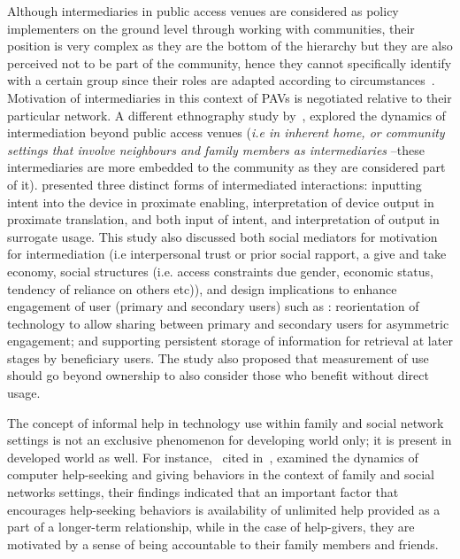 Although intermediaries in public access venues are considered as policy implementers on the ground level through working with communities, their position is very complex as they are the bottom of the hierarchy but they are also perceived not to be part of the community, hence they cannot specifically identify with a certain group since their roles are adapted according to circumstances~\citep{bailur2010liminal}. Motivation of intermediaries in this context of PAVs is negotiated relative to their particular network. A different ethnography study by~\cite{sambasivan2010}, explored the dynamics of intermediation beyond public access venues (\emph{i.e in inherent home, or community settings that involve neighbours and family members as intermediaries} --these intermediaries are more embedded to the community as they are considered part of it). \cite{sambasivan2010} presented three distinct forms of intermediated interactions: inputting intent into the device in proximate enabling, interpretation of device output in proximate translation, and both input of intent, and interpretation of output in surrogate usage. This study also discussed both social mediators for motivation for intermediation (i.e interpersonal trust or prior social rapport, a give and take economy, social structures (i.e. access constraints due gender, economic status, tendency of reliance on others etc)), and design implications to enhance engagement of user (primary and secondary users) such as : reorientation of technology  to allow sharing between primary and secondary users for asymmetric engagement; and supporting persistent storage of information for retrieval at later stages by beneficiary users. The study also proposed that measurement of use should go beyond ownership to also consider those who benefit without direct usage. 

The concept of informal help in technology use within family and social network settings is not an exclusive  phenomenon for developing world only; it is present in developed world as well. For instance,~\cite{poole:chh} cited in~\cite{katule2016leveraging}, examined the dynamics of computer help-seeking and giving behaviors in the context of family and social networks settings, their findings indicated that an important factor that  encourages help-seeking behaviors is availability of unlimited help provided as a part of a longer-term relationship, while in the case of help-givers, they are motivated by a sense of being accountable to their family members and friends.

